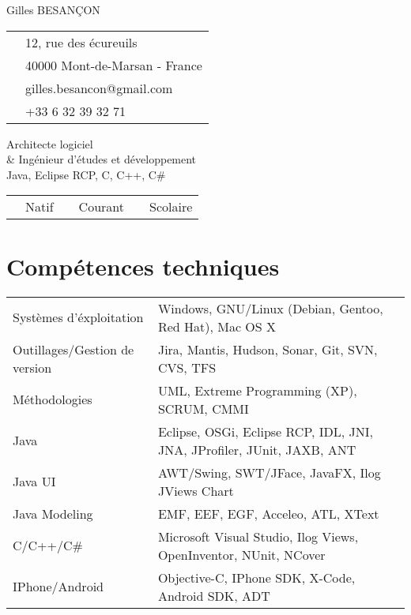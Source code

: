 \documentclass[10pt,letterpaper]{resume/resume}
\begin{document}
  \begin{minipage}[t]{\linewidth * 1 / 3}
    {\Large Gilles BESAN\c{C}ON}\\
      \begin{tabular}{c l}
         \address{&12, rue des \'ecureuils\\}{&40000 Mont-de-Marsan - France}\\
         \email{&gilles.besancon@gmail.com}\\
         \phone{&+33 6 32 39 32 71}\\
      \end{tabular}
  \end{minipage}
  \begin{minipage}[t]{\linewidth * 2 / 3}
    \begin{center}
      {\huge{Architecte logiciel\\\& Ing\'enieur d'\'etudes et d\'eveloppement\\Java, Eclipse RCP, C, C++, C\#}}
      \begin{tabular}{c l c l c l}
      \french{FR:&Natif}&\englishus{EN:&Courant}&\spanish{SP:&Scolaire}\\
      \end{tabular}
    \end{center}
  \end{minipage}

  \begin{minipage}[t]{\linewidth}
    \section{Comp\'etences techniques}
    \begin{tabular}{ll}
	Systèmes d'\'exploitation&Windows, GNU/Linux (Debian, Gentoo, Red Hat), Mac OS X\\
	Outillages/Gestion de version&Jira, Mantis, Hudson, Sonar, Git, SVN, CVS, TFS\\
	M\'ethodologies&UML, Extreme Programming (XP), SCRUM, CMMI\\
	Java&Eclipse, OSGi, Eclipse RCP, IDL, JNI, JNA, JProfiler, JUnit, JAXB, ANT\\
	Java UI&AWT/Swing, SWT/JFace, JavaFX, Ilog JViews Chart\\
	Java Modeling&EMF, EEF, EGF, Acceleo, ATL, XText\\
	C/C++/C\#&Microsoft Visual Studio, Ilog Views, OpenInventor, NUnit, NCover\\
	IPhone/Android&Objective-C, IPhone SDK, X-Code, Android SDK, ADT\\
    \end{tabular}
  \end{minipage}
  
\end{document}
